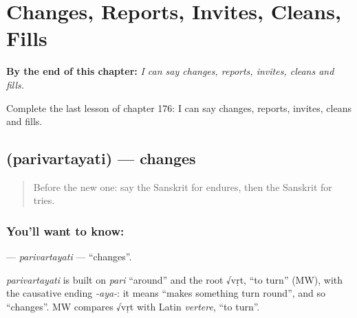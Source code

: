 
\chapter{Changes, Reports, Invites, Cleans, Fills}
\label{ch:sa-changes-reports-invites-cleans-fills}

\begin{chapteropening}
\textbf{By the end of this chapter:} \emph{I can say changes, reports, invites, cleans and fills.}

Complete the last lesson of chapter 176: I can say changes, reports, invites, cleans and fills.
\end{chapteropening}

\section[\texorpdfstring{\sk{परिवर्तयति} (parivartayati)}{परिवर्तयति (parivartayati)}]{ (parivartayati) — changes}

\label{lesson:SA-C176-parivartayati}



\begin{quote}
Before the new one: say the Sanskrit for endures, then the Sanskrit for tries.
\end{quote}

\subsection*{You'll want to know: }
\textbf{} — \emph{parivartayati} — \textquotedblleft{}changes\textquotedblright{}.

\begin{cousinweb}
\emph{parivartayati} is built on \emph{pari} \textquotedblleft{}around\textquotedblright{} and the root √vṛt, \textquotedblleft{}to turn\textquotedblright{} (MW), with the causative ending \emph{-aya-}: it means \textquotedblleft{}makes something turn round\textquotedblright{}, and so \textquotedblleft{}changes\textquotedblright{}. MW compares √vṛt with Latin \emph{vertere}, \textquotedblleft{}to turn\textquotedblright{}.
\end{cousinweb}

